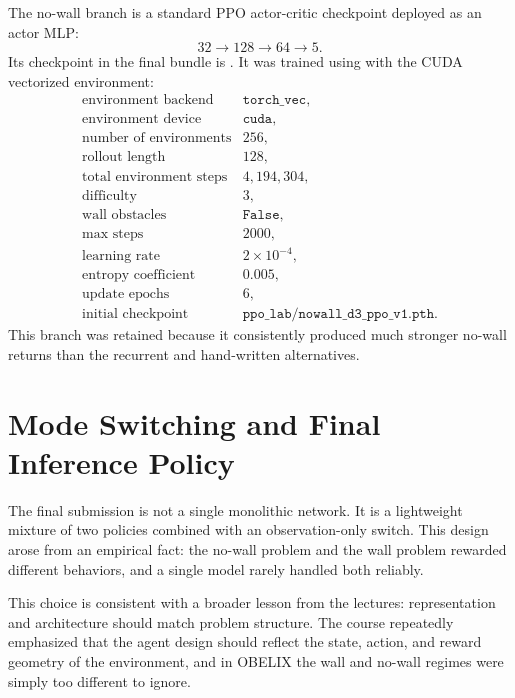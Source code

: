 \documentclass[11pt, oneside]{article}   	%
\begin{document}
The no-wall branch is a standard PPO actor-critic checkpoint deployed as an actor MLP:
\[
  32 \rightarrow 128 \rightarrow 64 \rightarrow 5.
\]
Its checkpoint in the final bundle is . It was
trained using  with the CUDA vectorized environment:
\[
\begin{array}{ll}
\text{environment backend} & \texttt{torch\_vec},\\
\text{environment device} & \texttt{cuda},\\
\text{number of environments} & 256,\\
\text{rollout length} & 128,\\
\text{total environment steps} & 4{,}194{,}304,\\
\text{difficulty} & 3,\\
\text{wall obstacles} & \texttt{False},\\
\text{max steps} & 2000,\\
\text{learning rate} & 2\times10^{-4},\\
\text{entropy coefficient} & 0.005,\\
\text{update epochs} & 6,\\
\text{initial checkpoint} & \texttt{ppo\_lab/nowall\_d3\_ppo\_v1.pth}.
\end{array}
\]
This branch was retained because it consistently produced much stronger no-wall returns
than the recurrent and hand-written alternatives.

\section{Mode Switching and Final Inference Policy}

The final submission is not a single monolithic network. It is a lightweight mixture of
two policies combined with an observation-only switch. This design arose from an
empirical fact: the no-wall problem and the wall problem rewarded different behaviors,
and a single model rarely handled both reliably.

This choice is consistent with a broader lesson from the lectures: representation and
architecture should match problem structure. The course repeatedly emphasized that the
agent design should reflect the state, action, and reward geometry of the environment,
and in OBELIX the wall and no-wall regimes were simply too different to ignore.
\end{document}
